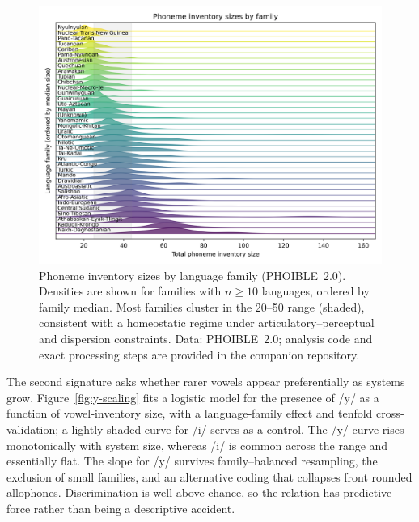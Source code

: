 \documentclass[12pt]{article}
\begin{document}
\begin{figure}[t]
  \centering
  \includegraphics[width=\linewidth]{images/inventory_ridgelines.png}
  \caption{Phoneme inventory sizes by language family (PHOIBLE~2.0).
  Densities are shown for families with $n \ge 10$ languages, ordered by family median.
  Most families cluster in the 20–50 range (shaded), consistent with a homeostatic regime under articulatory–perceptual and dispersion constraints.
  Data: PHOIBLE~2.0; analysis code and exact processing steps are provided in the companion repository.}
  \label{fig:ridgelines}
\end{figure}

The second signature asks whether rarer vowels appear preferentially as systems grow. Figure~\ref{fig:y-scaling} fits a logistic model for the presence of /y/ as a function of vowel‐inventory size, with a language‐family effect and tenfold cross‐validation; a lightly shaded curve for /i/ serves as a control. The /y/ curve rises monotonically with system size, whereas /i/ is common across the range and essentially flat. The slope for /y/ survives family–balanced resampling, the exclusion of small families, and an alternative coding that collapses front rounded allophones. Discrimination is well above chance, so the relation has predictive force rather than being a descriptive accident.
\end{document}
